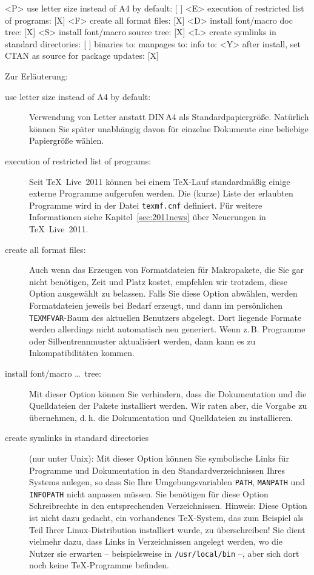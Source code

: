 \documentclass[12pt,ngerman,a4paper,fullparskip]{report}
\newcommand{\TL}{\TeX\ Live\xspace}
\newcommand{\filename}[1]{\texttt{#1}}
\newcommand{\dirname}[1]{\texttt{#1}}
\newcommand{\envname}[1]{\texttt{#1}}
\begin{document}
\begin{boxedverbatim}
 <P> use letter size instead of A4 by default: [ ]
 <E> execution of restricted list of programs: [X]
 <F> create all format files:                  [X]
 <D> install font/macro doc tree:              [X]
 <S> install font/macro source tree:           [X]
 <L> create symlinks in standard directories:  [ ]
            binaries to:
            manpages to:
                info to:
 <Y> after install, set CTAN as source for package updates: [X]
\end{boxedverbatim}


 Zur Erläuterung:
\begin{description}
\item[use letter size instead of A4 by default:] Verwendung von Letter anstatt DIN\,A4 als
Standard\-papier\-größe. Natürlich können Sie später unabhängig davon für einzelne Dokumente eine
beliebige Papiergröße wählen.

\item[execution of restricted list of programs:] Seit \TL\ 2011 können bei einem
\TeX-Lauf standardmäßig einige externe Programme aufgerufen werden. Die (kurze) 
Liste der erlaubten Programme wird in der Datei \filename{texmf.cnf} definiert.
Für weitere Informationen siehe Kapitel~\ref{sec:2011news} über Neuerungen in 
\TL\ 2011.

\item[create all format files:] Auch wenn das Erzeugen von Formatdateien für Makropakete, die Sie gar nicht benötigen, Zeit und Platz kostet, empfehlen wir trotzdem, diese Option ausgewählt zu belassen.  Falls Sie diese Option abwählen, werden Formatdateien jeweils bei Bedarf erzeugt, und dann im persönlichen \dirname{TEXMFVAR}-Baum des aktuellen Benutzers abgelegt. Dort liegende Formate werden allerdings nicht automatisch neu generiert. Wenn z.\,B. Programme oder Silbentrennmuster aktualisiert werden, dann kann es zu Inkompatibilitäten kommen. 

\item[install font/macro \ldots\ tree:] Mit dieser Option können Sie  verhindern, dass die Dokumentation und die Quelldateien der Pakete  installiert werden. Wir raten aber, die Vorgabe zu übernehmen, d.\,h. die Dokumentation und Quelldateien zu installieren.

\item[create symlinks in standard directories] (nur unter Unix):
  Mit dieser Option können Sie symbolische Links für Programme und Dokumentation in den Standard\-verzeichnissen   Ihres Systems anlegen, so dass Sie Ihre Umgebungsvariablen \envname{PATH}, \envname{MANPATH} und \envname{INFOPATH} nicht anpassen müssen. Sie benötigen für diese Option Schreibrechte in den entsprechenden Verzeichnissen. Hinweis: Diese Option ist nicht dazu gedacht, ein vorhandenes \TeX-System, das zum Beispiel als Teil Ihrer Linux-Distribution installiert wurde, zu überschreiben! Sie dient vielmehr dazu, dass Links in Verzeichnissen angelegt werden, wo die Nutzer sie erwarten -- beispielsweise in \dirname{/usr/local/bin} --, aber sich dort noch keine \TeX-Programme befinden.


\end{description}
\end{document}
